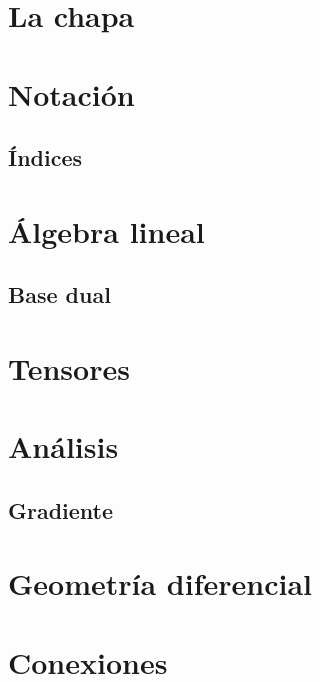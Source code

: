 \documentclass[11pt,fleqn]{book}
\begin{document}
\chapter{La chapa}

\chapter{Notaci\'on}\label{ch:notacion}

\section{\'Indices}\label{sec:indices}

\chapter{Álgebra lineal}\label{ch:algebra-lineal}
\section{Base dual}\label{sec:base-dual}

\chapter{Tensores}\label{ch:tensores}

\chapter{An\'alisis}\label{ch:analisis}
\section{Gradiente}\label{sec:gradiente}

\chapter{Geometría diferencial}\label{ch:geometria-diferencial}

\chapter{Conexiones}\label{ch:conexiones}

\end{document}
